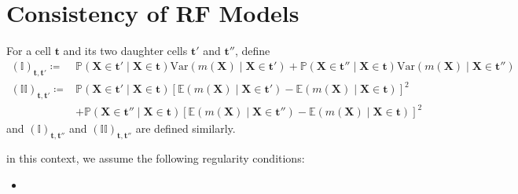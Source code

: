 \documentclass[twoside]{article}
\begin{document}
\section*{Consistency of RF Models}
For a cell $\mathbf{t}$ and its two daughter cells $\mathbf{t}'$ and $\mathbf{t}''$, define 
\begin{align*}
    \left(\mathbb{I}\right)_{\mathbf{t},\mathbf{t}'} \coloneq & \mathbb{P}\left(\mathbf{X}\in \mathbf{t}'\mid \mathbf{X} \in \mathbf{t}\right) \mathrm{Var} \left(m(\mathbf{X}) \mid \mathbf{X}\in\mathbf{t}'\right) + \mathbb{P}\left(\mathbf{X}\in \mathbf{t}''\mid \mathbf{X} \in \mathbf{t}\right)\mathrm{Var} \left(m(\mathbf{X}) \mid \mathbf{X}\in\mathbf{t}''\right) \\
    \left(\mathbb{II}\right)_{\mathbf{t},\mathbf{t}'} \coloneq & \mathbb{P}\left(\mathbf{X}\in \mathbf{t}'\mid \mathbf{X} \in \mathbf{t}\right) \left[\mathbb{E}(m(\mathbf{X})\mid \mathbf{X}\in\mathbf{t}') - \mathbb{E}(m(\mathbf{X})\mid \mathbf{X}\in \mathbf{t})\right]^2\\
    &+ \mathbb{P}\left(\mathbf{X}\in \mathbf{t}''\mid \mathbf{X} \in \mathbf{t}\right) \left[\mathbb{E}(m(\mathbf{X})\mid \mathbf{X}\in\mathbf{t}'') - \mathbb{E}(m(\mathbf{X})\mid \mathbf{X}\in \mathbf{t})\right]^2
\end{align*}
and $\left( \mathbb{I} \right)_{\mathbf{t,t}''}$ and $\left(\mathbb{II}\right)_{\mathbf{t,t}''}$ are defined similarly.

in this context, we assume the following regularity conditions:
\begin{itemize}
    \item 
\end{itemize}

\newpage


\end{document}

